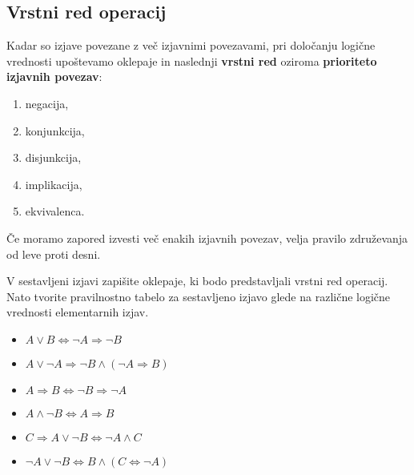          
             \subsection{Vrstni red operacij}
                Kadar so izjave povezane z več izjavnimi povezavami, pri določanju logične 
                vrednosti upoštevamo oklepaje in naslednji \textbf{vrstni red} oziroma
                \textbf{prioriteto izjavnih povezav}:
                \begin{enumerate}
                    \item negacija,
                    \item konjunkcija,
                    \item disjunkcija,
                    \item implikacija,
                    \item ekvivalenca.
                \end{enumerate}
             
              
                Če moramo zapored izvesti več enakih izjavnih povezav, velja pravilo združevanja 
                od leve proti desni.
             
         

         
             \begin{naloga}
                V sestavljeni izjavi zapišite oklepaje, ki bodo predstavljali vrstni red operacij.
                Nato tvorite pravilnostno tabelo za sestavljeno izjavo glede na različne logične 
                vrednosti elementarnih izjav.
                \begin{itemize}
                    \item $A\lor B\Leftrightarrow \lnot A\Rightarrow \lnot B$
                    \item $A\lor \lnot A\Rightarrow\lnot B\land (\lnot A\Rightarrow B) $
                    \item $A\Rightarrow B\Leftrightarrow \lnot B\Rightarrow \lnot A $
                    \item $A\land \lnot B\Leftrightarrow A \Rightarrow B$
                    \item $C\Rightarrow A\lor \lnot B\Leftrightarrow \lnot A\land C $
                    \item $\lnot A\lor \lnot B\Leftrightarrow B \land (C\Leftrightarrow \lnot A) $
                \end{itemize}
            \end{naloga}
         

